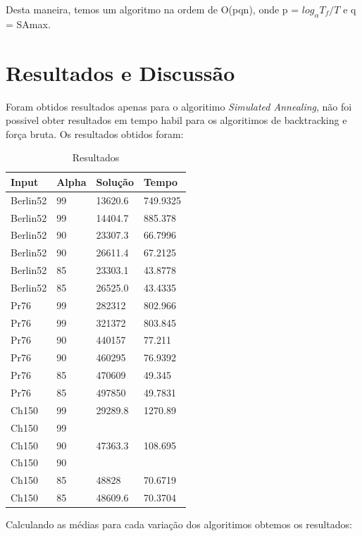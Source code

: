 \documentclass[a4paper, 12pt]{article}
\begin{document}
Desta maneira, temos um algoritmo na ordem de O(pqn), onde p = $log_\alpha T_f/T$ e q = SAmax.


\newpage
\section{Resultados e Discussão}

Foram obtidos resultados apenas para o algoritimo \textit{Simulated Annealing}, não foi possivel obter resultados em tempo habil para os algoritimos de backtracking e força bruta. Os resultados obtidos foram:

\begin{table}[h]

\label{tab:cpu}
\centering
\begin{tabular}{| l | l | l | l |}
\hline
\textbf{Input} & \textbf{Alpha} & \textbf{Solução} & \textbf{Tempo} \\\hline
Berlin52 & 99 & 13620.6 & 749.9325 \\\hline
Berlin52 & 99 & 14404.7 & 885.378 \\\hline
Berlin52 & 90 & 23307.3 & 66.7996 \\\hline
Berlin52 & 90 & 26611.4 & 67.2125 \\\hline
Berlin52 & 85 & 23303.1 & 43.8778 \\\hline
Berlin52 & 85 & 26525.0 & 43.4335 \\\hline
Pr76     & 99 & 282312  & 802.966 \\\hline
Pr76     & 99 & 321372  & 803.845 \\\hline
Pr76     & 90 & 440157  & 77.211 \\\hline
Pr76     & 90 & 460295  & 76.9392 \\\hline
Pr76     & 85 & 470609  & 49.345 \\\hline
Pr76     & 85 & 497850  & 49.7831 \\\hline
Ch150    & 99 & 29289.8 & 1270.89 \\\hline
Ch150    & 99 &  &  \\\hline
Ch150    & 90 & 47363.3 & 108.695 \\\hline
Ch150    & 90 &  &  \\\hline
Ch150    & 85 & 48828   & 70.6719 \\\hline
Ch150    & 85 & 48609.6 & 70.3704 \\\hline
\end{tabular}
\caption{Resultados}
\end{table}
\newpage
Calculando as médias para cada variação dos algoritimos obtemos os resultados:
\end{document}
